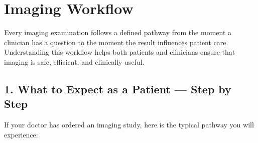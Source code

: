 \chapter{Imaging Workflow}

\label{ch:ch08_workflow}

Every imaging examination follows a defined pathway from the moment a clinician has a question to the moment the result influences patient care. Understanding this workflow helps both patients and clinicians ensure that imaging is safe, efficient, and clinically useful.


\section*{1. What to Expect as a Patient --- Step by Step}

If your doctor has ordered an imaging study, here is the typical pathway you will experience:

